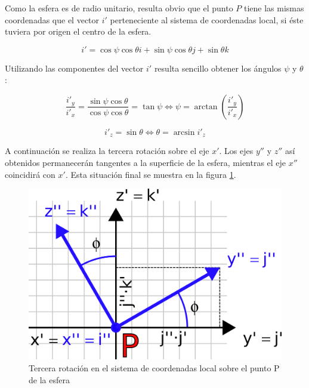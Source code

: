\documentclass[12pt, a4paper]{report}
\begin{document}
Como la esfera es de radio unitario, resulta obvio que el punto $P$ tiene las mismas coordenadas que el vector $i'$ perteneciente al sistema de coordenadas local, si éste tuviera por origen el centro de la esfera.

\begin{equation} \label{eq: E13}
i' = \cos \psi \cos \theta i + \sin \psi \cos \theta j + \sin \theta k
\end{equation}

Utilizando las componentes del vector $i'$ resulta sencillo obtener los ángulos $\psi$ y $\theta$:

\begin{equation}
\frac{i'_y}{i'_x} =  \frac{\sin \psi \cos \theta}{\cos \psi \cos \theta} = \tan{\psi} \iff \psi = \arctan \left( \frac{i'_y}{i'_x} \right)
\end{equation}

\begin{equation}
i'_z =  \sin \theta \iff \theta = \arcsin i'_z
\end{equation}

A continuación se realiza la tercera rotación sobre el eje $x'$. Los ejes $y''$ y $z''$ así obtenidos permanecerán tangentes a la superficie de la esfera, mientras el eje $x''$ coincidirá con $x'$. Esta situación final se muestra en la figura \ref{fig: esfera_local}.

\begin{figure}[h]
	\centering
		\includegraphics[scale=2]{../img/sphere_local.png} 
	\caption{Tercera rotación en el sistema de coordenadas local sobre el punto P de la esfera}
	\label{fig: esfera_local}
\end{figure}
\end{document}
